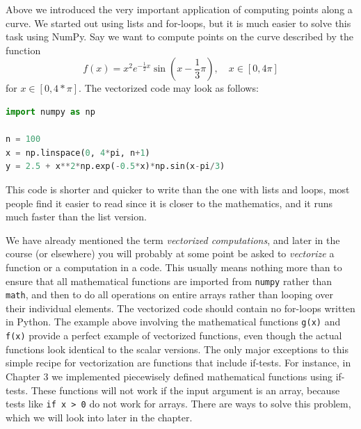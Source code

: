 \documentclass[graybox,envcountchap,sectrefs,final]{svmonodo}
\begin{document}
Above we introduced the very important application of computing points along a curve. We started out using lists
and for-loops, but it is much easier to solve this task using NumPy. Say we want to compute points on the curve
described by the function
\[ f(x) = x^2e^{-\frac{1}{2}x}\sin(x-\frac{1}{3}\pi),\quad x\in [0, 4\pi]\]
for $x\in [0,4*\pi]$. The vectorized code may look as follows:
\begin{lstlisting}[language=Python,style=blue1]
import numpy as np

n = 100
x = np.linspace(0, 4*pi, n+1)
y = 2.5 + x**2*np.exp(-0.5*x)*np.sin(x-pi/3)
\end{lstlisting}
This code is shorter and quicker to write than the one with lists and loops, most people find it easier to read
since it is closer to the mathematics, and it runs much faster than the list version.

We have already mentioned the term \emph{vectorized computations}, and later in the course (or elsewhere) you will
probably at some point be asked to \emph{vectorize} a function or a computation in a code.
This usually means nothing more than to ensure that all mathematical functions are imported from \texttt{numpy} rather
than \texttt{math}, and then to do all operations on entire arrays rather than looping over their individual elements.
The vectorized code should contain no for-loops written in Python. The example above involving the
mathematical functions \texttt{g(x)} and \texttt{f(x)} provide a perfect example of vectorized functions, even though
the actual functions look identical to the scalar versions. The only major exceptions to this simple recipe for
vectorization are functions that include if-tests. For instance, in Chapter 3 we implemented
piecewisely defined mathematical functions using if-tests. These functions will not work if the input argument is
an array, because tests like \texttt{if x > 0} do not work for arrays. There are ways to solve this problem, which we
will look into later in the chapter.
\end{document}
